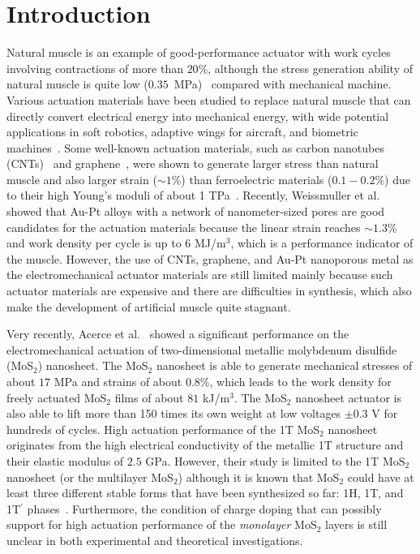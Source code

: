 \documentclass[12pt]{iopart}
\begin{document}
\section{Introduction}
Natural muscle is an example of good-performance actuator with work
cycles involving contractions of more than $20$\%, although the stress
generation ability of natural muscle is quite low
($0.35$~MPa)~\cite{madden2004artificial} compared with mechanical
machine.  Various actuation materials have been studied to replace
natural muscle that can directly convert electrical energy into
mechanical energy, with wide potential applications in soft robotics,
adaptive wings for aircraft, and biometric
machines~\cite{madden2004artificial}.  Some well-known actuation
materials, such as carbon nanotubes
(CNTs)~\cite{baughman1999carbon,hung2017charge} and
graphene~\cite{rogers2011graphene,xie2011load}, were shown to generate
larger stress than natural muscle and also larger strain ($\sim1$\%)
than ferroelectric materials ($0.1-0.2$\%) due to their high Young's
moduli of about 1 TPa~\cite{yu2000tensile,hung2016intrinsic}.
Recently, Weissmuller et
al.~\cite{weissmuller2003charge,jin2009nanoporous} showed that Au-Pt
alloys with a network of nanometer-sized pores are good candidates for
the actuation materials because the linear strain reaches $\sim1.3$\%
and work density per cycle is up to 6 MJ/m$^3$, which is a performance
indicator of the muscle.  However, the use of CNTs, graphene, and
Au-Pt nanoporous metal as the electromechanical actuator materials are
still limited mainly because such actuator materials are expensive and
there are difficulties in synthesis, which also make the development
of artificial muscle quite stagnant.  

Very recently, Acerce et al.~\cite{acerce2017metallic} showed a
significant performance on the electromechanical actuation of
two-dimensional metallic molybdenum disulfide (MoS$_2$) nanosheet.
The MoS$_2$ nanosheet is able to generate mechanical stresses of about
$17$ MPa and strains of about $0.8$\%, which leads to the work density
for freely actuated MoS$_2$ films of about $81$ kJ/m$^3$. The MoS$_2$
nanosheet actuator is also able to lift more than 150 times its own
weight at low voltages $\pm0.3$ V for hundreds of cycles. High
actuation performance of the 1T MoS$_2$ nanosheet originates from the
high electrical conductivity of the metallic 1T structure and their
elastic modulus of $2.5$ GPa.  However, their study is limited to the
1T MoS$_2$ nanosheet (or the multilayer
MoS$_2$) although it is known that MoS$_2$ could have at
least three different stable forms that have been synthesized so far:
1H, 1T, and 1T$^\prime$
phases~\cite{lin2014atomic,naylor2016monolayer}.  Furthermore, the
condition of charge doping that can possibly support for high
actuation performance of the \emph{monolayer} MoS$_2$ layers is still unclear in both experimental and theoretical investigations.
\end{document}
